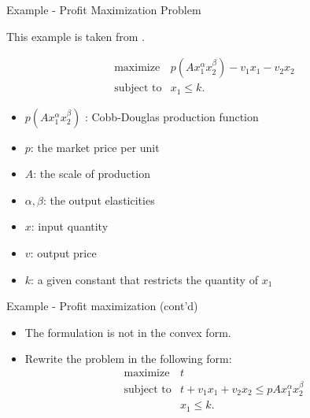 \documentclass[
  ignorenonframetext,
  aspectratio=169,
  serif,onlymath]{beamer}
\providecommand{\tightlist}{%
  \setlength{\itemsep}{0pt}\setlength{\parskip}{0pt}}
\begin{document}
\begin{frame}{Example - Profit Maximization Problem}
\protect\hypertarget{example---profit-maximization-problem}{}

This example is taken from \citep{Aliabadi2013Robust}.

\[\begin{array}{ll}
   \text{maximize} & p(A x_1^\alpha x_2^\beta) - v_1 x_1 - v_2 x_2 \\
   \text{subject to}& x_1 \le k.
\end{array}\]

\begin{itemize}
\tightlist
\item
  \(p(A x_1^\alpha x_2^\beta)\) : Cobb-Douglas production function
\item
  \(p\): the market price per unit
\item
  \(A\): the scale of production
\item
  \(\alpha, \beta\): the output elasticities
\item
  \(x\): input quantity
\item
  \(v\): output price
\item
  \(k\): a given constant that restricts the quantity of \(x_1\)
\end{itemize}

\end{frame}

\begin{frame}{Example - Profit maximization (cont'd)}
\protect\hypertarget{example---profit-maximization-contd}{}

\begin{itemize}
\tightlist
\item
  The formulation is not in the convex form.
\item
  Rewrite the problem in the following form: \[\begin{array}{ll}
    \text{maximize} & t \\
    \text{subject to} & t  + v_1 x_1  + v_2 x_2 \le p A x_1^{\alpha} x_2^{\beta}\\
                  & x_1 \le k.
    \end{array}\]
\end{itemize}

\end{frame}
\end{document}
